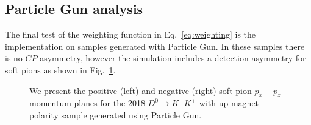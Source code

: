 \documentclass{article}
\begin{document}
        \subsection{Particle Gun analysis}
        The final test of the weighting function in Eq.~\ref{eq:weighting} is the implementation on samples generated with Particle Gun.
        In these samples there is no $CP$ asymmetry, however the simulation includes a detection asymmetry for soft pions as shown in Fig.~\ref{fig:detection_pgun}.
        \begin{figure}[h!]
                \centering
                \caption{We present the positive (left) and negative (right) soft pion $p_x - p_z$ momentum planes for the 2018 $D^0\to K^-K^+$ with up magnet polarity sample generated using Particle Gun.}
                \label{fig:detection_pgun}
        \end{figure}


\end{document}
